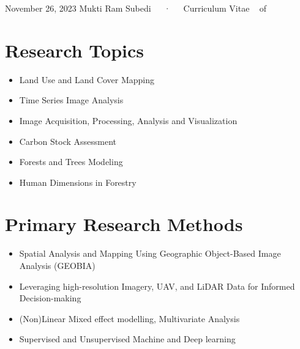 \documentclass[11pt,a4paper,]{awesome-cv}
\providecommand{\tightlist}{%
	\setlength{\itemsep}{0pt}\setlength{\parskip}{0pt}}
\begin{document}
\makecvheader

\makecvfooter
  {November 26, 2023}
    {Mukti Ram Subedi~~~·~~~Curriculum Vitae}
  {\thepage~ of \pageref{LastPage}~}





\section{Research Topics}\label{research-topics}

\begin{itemize}
\tightlist
\item
  Land Use and Land Cover Mapping
\item
  Time Series Image Analysis
\item
  Image Acquisition, Processing, Analysis and Visualization
\item
  Carbon Stock Assessment
\item
  Forests and Trees Modeling
\item
  Human Dimensions in Forestry
\end{itemize}

\section{Primary Research Methods}\label{primary-research-methods}

\begin{itemize}
\tightlist
\item
  Spatial Analysis and Mapping Using Geographic Object-Based Image
  Analysis (GEOBIA)
\item
  Leveraging high-resolution Imagery, UAV, and LiDAR Data for Informed
  Decision-making
\item
  (Non)Linear Mixed effect modelling, Multivariate Analysis
\item
  Supervised and Unsupervised Machine and Deep learning
\end{itemize}
\end{document}
